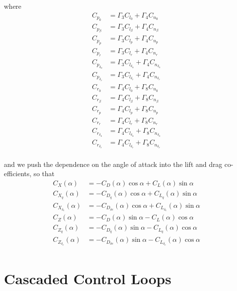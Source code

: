 \documentclass{article}
\begin{document}
where 
\begin{align*}
  C_{p_0} &= \Gamma_3 C_{l_0} + \Gamma_4 C_{n_0} \\
  C_{p_\beta} &= \Gamma_3 C_{l_\beta} + \Gamma_4 C_{n_\beta} \\
  C_{p_p} &= \Gamma_3 C_{l_p} + \Gamma_4 C_{n_p} \\
  C_{p_r} &= \Gamma_3 C_{l_r} + \Gamma_4 C_{n_r} \\
  C_{p_{\delta_a}} &= \Gamma_3 C_{l_{\delta_a}} + \Gamma_4 C_{n_{\delta_a}} \\
  C_{p_{\delta_r}} &= \Gamma_3 C_{l_{\delta_r}} + \Gamma_4 C_{n_{\delta_r}} \\
  C_{r_0} &= \Gamma_4 C_{l_0} + \Gamma_8 C_{n_0} \\
  C_{r_\beta} &= \Gamma_4 C_{l_\beta} + \Gamma_8 C_{n_\beta} \\
  C_{r_p} &= \Gamma_4 C_{l_p} + \Gamma_8 C_{n_p} \\
  C_{r_r} &= \Gamma_4 C_{l_r} + \Gamma_8 C_{n_r} \\
  C_{r_{\delta_a}} &= \Gamma_4 C_{l_{\delta_a}} + \Gamma_8 C_{n_{\delta_a}} \\
  C_{r_{\delta_r}} &= \Gamma_4 C_{l_{\delta_r}} + \Gamma_8 C_{n_{\delta_r}} \\
\end{align*}

and we push the dependence on the angle of attack into the lift and drag
co-efficients, so that 
\begin{align*}
  C_X(\alpha) &= -C_D(\alpha) \cos \alpha + C_L(\alpha) \sin \alpha \\
  C_{X_q}(\alpha) &= -C_{D_q}(\alpha) \cos \alpha + C_{L_q}(\alpha) \sin \alpha \\
  C_{X_{\delta_e}}(\alpha) &= -C_{D_{\delta e}}(\alpha) \cos \alpha +
  C_{L_{\delta_e}}(\alpha) \sin \alpha \\ 
  C_Z(\alpha) &= -C_D(\alpha) \sin \alpha - C_L(\alpha) \cos \alpha \\
  C_{Z_q}(\alpha) &= -C_{D_q}(\alpha) \sin \alpha - C_{L_q}(\alpha) \cos \alpha \\
  C_{Z_{\delta_e}}(\alpha) &= -C_{D_{\delta e}}(\alpha) \sin \alpha -
  C_{L_{\delta_e}}(\alpha) \cos \alpha \\ 
\end{align*}

\section{Cascaded Control Loops} 
\end{document}
